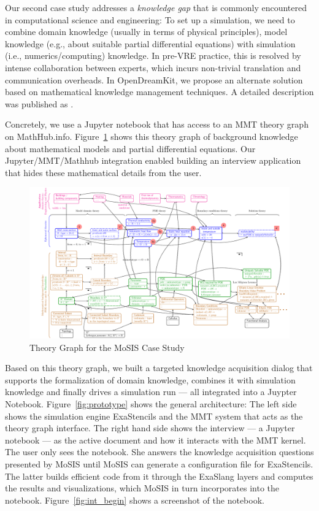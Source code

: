 Our second case study addresses a \emph{knowledge gap} that is commonly encountered in computational science and engineering:
To set up a simulation, we need to combine domain knowledge (usually in terms of physical principles), model knowledge (e.g., about suitable partial differential equations) with simulation (i.e., numerics/computing) knowledge.
In pre-VRE practice, this is resolved by intense collaboration between experts, which incurs non-trivial translation and communication overheads.
In OpenDreamKit, we propose an alternate solution based on mathematical knowledge management techniques.
A detailed description was published as \cite{PolKohKoe:kacse18}.

Concretely, we use a Jupyter notebook that has access to an MMT theory graph on MathHub.info.
Figure~\ref{fig:pde-theory} shows this theory graph of background knowledge about mathematical models and partial differential equations.
Our Jupyter/MMT/Mathhub integration enabled building an interview application that hides these mathematical details from the user.  

\begin{figure}[h!p]\centering
  \begin{turn}{-90}\includegraphics[width=0.95\textheight]{pde-theory}\end{turn}
  \caption{Theory Graph for the MoSIS Case Study}\label{fig:pde-theory}
\end{figure}

Based on this theory graph, we built a targeted knowledge acquisition dialog that supports the formalization of domain knowledge, combines it with simulation knowledge and finally drives a simulation run --- all integrated into a Juypter Notebook.
Figure~\ref{fig:prototype} shows the general architecture:
The left side shows the simulation engine \textsf{ExaStencils} and the MMT system that acts as the theory graph interface.
The right hand side shows the interview --- a Jupyter notebook --- as the active document and how it interacts with the MMT kernel.
The user only sees the notebook.
She answers the knowledge acquisition questions presented by MoSIS until MoSIS can generate a configuration file for ExaStencils.
The latter builds efficient code from it through the ExaSlang layers and computes the results and visualizations, which MoSIS in turn incorporates into the notebook. 
Figure~\ref{fig:int_begin} shows a screenshot of the notebook.

